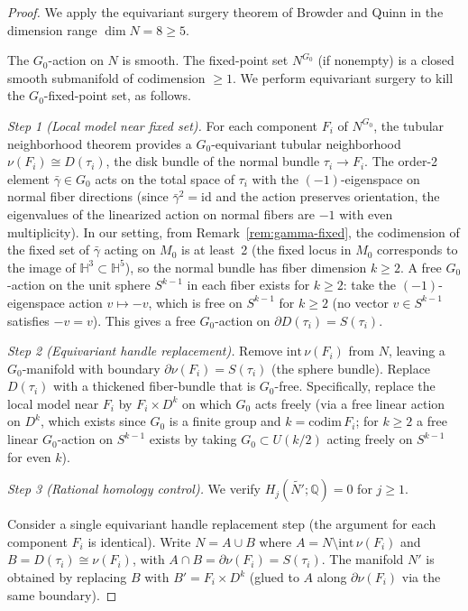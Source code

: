 \documentclass[12pt]{article}
\theoremstyle{definition}
\theoremstyle{remark}
\begin{document}
\begin{proof}
We apply the equivariant surgery theorem of Browder and Quinn
\cite{BrowderQuinn1975} in the dimension range $\dim N = 8 \geq 5$.

The $G_0$-action on $N$ is smooth. The fixed-point set $N^{G_0}$ (if nonempty) is a
closed smooth submanifold of codimension $\geq 1$. We perform equivariant surgery to
kill the $G_0$-fixed-point set, as follows.

\medskip
\noindent\textit{Step 1 (Local model near fixed set).} For each component $F_i$ of
$N^{G_0}$, the tubular neighborhood theorem provides a $G_0$-equivariant tubular
neighborhood $\nu(F_i) \cong D(\tau_i)$, the disk bundle of the normal bundle
$\tau_i \to F_i$. The order-2 element $\bar\gamma \in G_0$ acts on the total space of
$\tau_i$ with the $(-1)$-eigenspace on normal fiber directions (since $\bar\gamma^2 = \mathrm{id}$
and the action preserves orientation, the eigenvalues of the linearized action on
normal fibers are $-1$ with even multiplicity). In our setting, from Remark~\ref{rem:gamma-fixed},
the codimension of the fixed set of $\bar\gamma$ acting on $M_0$ is at least~2
(the fixed locus in $M_0$ corresponds to the image of $\mathbb{H}^3 \subset \mathbb{H}^5$),
so the normal bundle has fiber dimension $k \geq 2$. A free $G_0$-action on the
unit sphere $S^{k-1}$ in each fiber exists for $k \geq 2$: take the $(-1)$-eigenspace
action $v \mapsto -v$, which is free on $S^{k-1}$ for $k \geq 2$ (no vector $v \in S^{k-1}$
satisfies $-v = v$). This gives a free $G_0$-action on $\partial D(\tau_i) = S(\tau_i)$.

\medskip
\noindent\textit{Step 2 (Equivariant handle replacement).} Remove $\mathrm{int}\,\nu(F_i)$
from $N$, leaving a $G_0$-manifold with boundary $\partial\nu(F_i) = S(\tau_i)$ (the
sphere bundle). Replace $D(\tau_i)$ with a thickened fiber-bundle that is $G_0$-free.
Specifically, replace the local model near $F_i$ by $F_i \times D^k$ on which $G_0$ acts
freely (via a free linear action on $D^k$, which exists since $G_0$ is a finite group
and $k = \mathrm{codim}\, F_i$; for $k \geq 2$ a free linear $G_0$-action on $S^{k-1}$
exists by taking $G_0 \subset U(k/2)$ acting freely on $S^{k-1}$ for even $k$).

\medskip
\noindent\textit{Step 3 (Rational homology control).}
We verify $H_j(\widetilde{N'};\mathbb{Q}) = 0$ for $j \geq 1$.

Consider a single equivariant handle replacement step (the argument for each component
$F_i$ is identical). Write $N = A \cup B$ where $A = N \setminus \mathrm{int}\,\nu(F_i)$
and $B = D(\tau_i) \cong \nu(F_i)$, with $A \cap B = \partial\nu(F_i) = S(\tau_i)$.
The manifold $N'$ is obtained by replacing $B$ with $B' = F_i \times D^k$ (glued
to $A$ along $\partial\nu(F_i)$ via the same boundary).


\end{proof}
\end{document}
